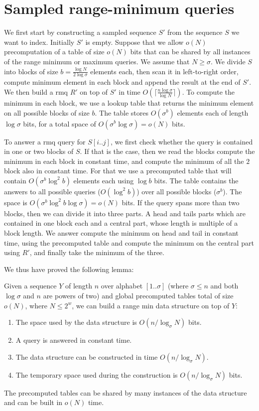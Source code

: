 \documentclass[11pt,runningheads]{llncs}
\begin{document}
\section{Sampled range-minimum queries}
\label{sec:sampled_rmq}
We first start by constructing a sampled sequence $S'$ from the sequence $S$ we want to index. 
Initially $S'$ is empty. Suppose that we allow $o(N)$ precomputation of a table of size $o(N)$ bits 
that can be shared by all instances of the range minimum or maximum queries. We assume that $N\geq\sigma$. 
We divide $S$ into blocks of size $b=\frac{\log N}{2\log\sigma}$ elements each, then scan it in left-to-right order, compute minimum element in each block and append the result at the end of $S'$. We then build 
a rmq $R'$ on top of $S'$ in time $O(\lceil\frac{n\log\sigma}{\log N}\rceil )$. To compute the minimum in each block, 
we use a lookup table that returns the minimum element on all possible blocks of size $b$. The table stores $O(\sigma^b)$ 
elements each of length $\log\sigma$ bits, for a total space of $O(\sigma^{b}\log\sigma)=o(N)$ bits. 

To answer a rmq query for $S[i..j]$, we first check whether the query is contained in one or two blocks of $S$. If that is the case, then we read the blocks  compute the minimum in each block in constant time, and compute the minimum of all the $2$ block also in constant time. For that we use a precomputed table that will contain $O(\sigma^{b}\log^2 b)$ elements each using $\log b$ bits. The table contains the answers to all possible queries ($O(\log^2b)$) over all possible blocks ($\sigma^b$). 
The space is $O(\sigma^{b}\log^2b\log\sigma)=o(N)$ bits. 
If the query spans more than two blocks, then we can divide it into three parts. A head and tails parts which are contained in one block each and a central part, whose length is multiple of a block length. We answer compute the minimum on head and tail 
in constant time, using the precomputed table and compute the minimum on the central part using $R'$, and finally take the minimum of the three. 

We thus have proved the following lemma: 
\begin{lemma}
\label{fast_rmq_build_lemma}
Given a sequence $Y$ of length $n$ over alphabet $[1..\sigma]$ (where $\sigma\leq n$ and both $\log\sigma$ and $n$ 
are powers of two) and global precomputed tables total of size $o(N)$, where $N\leq 2^w$, we can build a range min data structure on top of $Y$: 
\begin{enumerate} 
\item The space used by the data structure is $O(n/\log_\sigma N)$ bits. 
\item A query is answered in constant time. 
\item The data structure can be constructed in time $O(n/\log_\sigma N)$. 
\item The temporary space used during the construction is $O(n/\log_\sigma N)$ bits. 
\end{enumerate}
The precomputed tables can be shared by many instances of the data structure and can be built in $o(N)$ time. 
\end{lemma}
\end{document}
